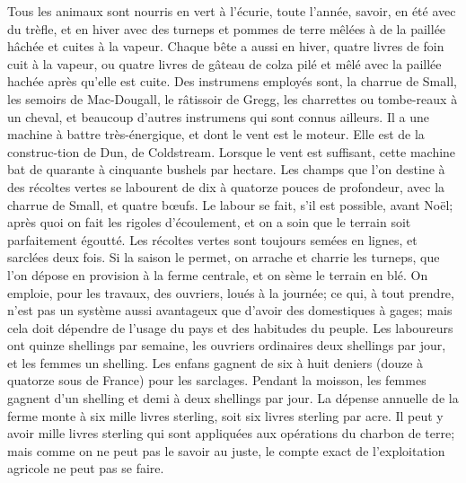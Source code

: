 Tous les animaux sont nourris en vert à l'écurie, toute l'année, savoir, en été avec du trèfle, et en hiver avec des turneps et pommes de terre mêlées à de la paillée hâchée et cuites à la vapeur. Chaque bête a aussi en hiver, quatre livres de foin cuit à la vapeur, ou quatre livres de gâteau de colza pilé et mêlé avec la paillée hachée après qu'elle est cuite.
Des instrumens employés sont, la charrue de Small, les semoirs de Mac-Dougall, le râtissoir de Gregg, les charrettes ou tombe-reaux à un cheval, et beaucoup d'autres instrumens qui sont connus ailleurs. Il a une machine à battre très-énergique, et dont le vent est le moteur. Elle est de la construc-tion de Dun, de Coldstream. Lorsque le vent est suffisant, cette machine bat de quarante à cinquante bushels par hectare.
Les champs que l'on destine à des récoltes vertes se labourent de dix à quatorze pouces de profondeur, avec la charrue de Small, et quatre bœufs. Le labour se fait, s'il est possible, avant Noël; après quoi on fait les rigoles d'écoulement, et on a soin que le terrain soit parfaitement égoutté. Les récoltes vertes sont toujours semées en lignes, et sarclées deux fois.\setcounter{page}{207} Si la saison le permet, on arrache et charrie les turneps, que l'on dépose en provision à la ferme centrale, et on sème le terrain en blé.
On emploie, pour les travaux, des ouvriers, loués à la journée; ce qui, à tout prendre, n'est pas un système aussi avantageux que d'avoir des domestiques à gages; mais cela doit dépendre de l'usage du pays et des habitudes du peuple. Les laboureurs ont quinze shellings par semaine, les ouvriers ordinaires deux shellings par jour, et les femmes un shelling. Les enfans gagnent de six à huit deniers (douze à quatorze sous de France) pour les sarclages. Pendant la moisson, les femmes gagnent d'un shelling et demi à deux shellings par jour.
La dépense annuelle de la ferme monte à six mille livres sterling, soit six livres sterling par acre. Il peut y avoir mille livres sterling qui sont appliquées aux opérations du charbon de terre; mais comme on ne peut pas le savoir au juste, le compte exact de l'exploitation agricole ne peut pas se faire.

